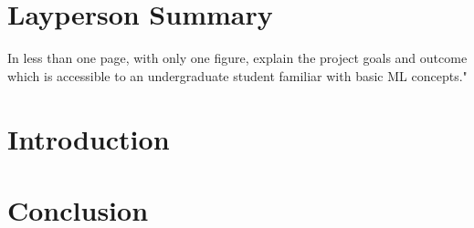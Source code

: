 \documentclass[NOTE, disdraft=true, UKenglish]{\DISCDTLATEXPATH UCLCDTDISdoc}
\begin{document}
\maketitle

\tableofcontents

\clearpage


\newpage
\section{Layperson Summary}
\label{sec:summary}
In less than one page, with only one figure, explain the project goals and outcome which is accessible to an undergraduate student familiar with basic ML concepts."


\newpage
\section{Introduction}
\label{sec:introduction}
%

\section{Conclusion}
\label{sec:conclusion}
%
\end{document}
